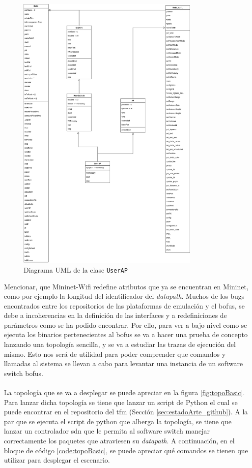 \begin{figure}[ht]
    \centering
    \includegraphics[width=0.8\textwidth]{archivos/img/analisis/userAP.png}
    \caption{Diagrama UML de la clase \texttt{UserAP}}
    \label{fig:userAP}
\end{figure}

Mencionar, que Mininet-Wifi redefine atributos que ya se encuentran en Mininet, como por ejemplo la longitud del identificador del \textit{datapath}. Muchos de los bugs encontrados entre los repositorios de las plataformas de emulación y el \gls{bofus}, se debe a incoherencias en la definición de las interfaces y a redefiniciones de parámetros como se ha podido encontrar. Por ello, para ver a bajo nivel como se ejecuta los binarios pertenecientes al \gls{bofus} se va a hacer una prueba de concepto lanzando una topología sencilla, y se va a estudiar las trazas de ejecución del mismo. Esto nos será de utilidad para poder comprender que comandos y llamadas al sistema se llevan a cabo para levantar una instancia de un software switch \gls{bofus}.\\
\\
La topología que se va a desplegar se puede apreciar en la figura \ref{fig:topoBasic}. Para lanzar dicha topología se tiene que lanzar un script de Python el cual se puede encontrar en el repositorio del \gls{tfm} (Sección \ref{sec:estadoArte_github}). A la par que se ejecuta el script de python que alberga la topología, se tiene que lanzar un controlador \gls{sdn} que le permita al software switch manejar correctamente los paquetes que atraviesen su \textit{datapath}. A continuación, en el bloque de código \ref{code:topoBasic}, se puede apreciar qué comandos se tienen que utilizar para  desplegar el escenario. \\

